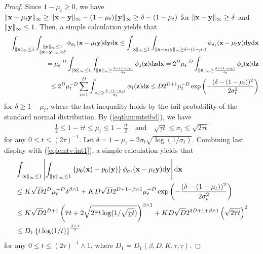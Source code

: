 \documentclass[twoside,11pt]{article}
\newcommand{\bx}{{\bf x}}
\newcommand{\by}{{\bf y}}
\newcommand{\bz}{{\bf z}}
\newcommand{\be}{\begin{equation}}
\newcommand{\ee}{\end{equation}}
\newcommand{\bean}{\setlength\arraycolsep{1pt}\begin{eqnarray*}}
\newcommand{\eean}{\end{eqnarray*}}
\def\d{{\rm d}}
\begin{document}
\begin{proof}
Since $1-\mu_t \geq 0 $, we have $\| \bx- \mu_{t} \by \|_{\infty} \geq \| \bx - \by\|_{\infty} -  ( 1 - \mu_t ) \|\by\|_{\infty} \geq \delta - ( 1 - \mu_t )$ for $\|\bx-\by\|_{\infty} \geq \delta$ and $\| \by\|_{\infty} \leq 1$.
Then, a simple calculation yields that
\bean
&& \int_{\| \bx \|_{\infty} \leq 1} \int_{\substack{ \| \by \|_{\infty} \leq 1 \\ \|\bx-\by\|_{\infty}\geq \delta  }}  \phi_{\sigma_{t}}(\bx-\mu_t \by) \d \by \d \bx \leq 
\int_{\| \bx \|_{\infty} \leq 1} \int_{ \|\bx-\mu_t\by\|_{\infty} \geq \delta - (1-\mu_t)  } \phi_{\sigma_t}(\bx-\mu_t \by) \d \by \d \bx
\\
&& = \mu_t^{-D} \int_{\| \bx \|_{\infty} \leq 1} \int_{\|\bz\|_{\infty} \geq \frac{\delta - (1-\mu_t)}{\sigma_t}} \phi_{1}(\bz) \d \bz \d \bx
= 2^{D} \mu_t^{-D} \int_{\|\bz\|_{\infty} \geq \frac{\delta - (1-\mu_t)}{\sigma_t}} \phi_{1}(\bz) \d \bz 
\\
&& \leq 2^{D} \mu_t^{-D} \sum_{i=1}^{D} \int_{\vert z_i \vert \geq \frac{\delta - (1-\mu_t)}{\sigma_t}} \phi_{1}(\bz) \d \bz
\leq D 2^{D+1} \mu_{t}^{-D} \exp \left( -\frac{ (\delta - (1-\mu_t))^2  }{2\sigma_t^2} \right)
\eean
for $\delta \geq 1-\mu_t$, where the last inequality holds by the tail probability of the standard normal distribution.
By (\ref{eqthm:mtstbd}), we have
\bean
 \frac{1}{2} \leq 1- \overline{\tau}t \leq \mu_t \leq 1- \frac{\underline{\tau}t}{2} \quad \text{and} \quad 
\sqrt{\underline{\tau}t } \leq \sigma_t \leq \sqrt{2\overline{\tau}t}
\eean
for any $0 \leq t \leq (2\overline{\tau})^{-1}$.
Let $\delta = 1-\mu_t +  2\sigma_{t} \sqrt{\log (1/\sigma_t)}$.
Combining last display with (\ref{eqlemtv:int1}), a simple calculation yields that
\be \begin{split}
 & \int_{\| \bx \|_{\infty} \leq 1} \left\vert   \int_{\| \by \|_{\infty} \leq 1} \left\{ p_0(\bx) - p_0(\by) \right\} \phi_{\sigma _t}(\bx - \mu_t \by) \d \by \right\vert \d \bx 
 \\
 & \leq K\sqrt{D} 2^{D} \mu_{t}^{-D} \delta^{\beta \wedge 1} + KD\sqrt{D} 2^{D + 1 + \beta \wedge 1} \mu_{t}^{-D} \exp \left( -\frac{ (\delta - (1-\mu_t))^2  }{2\sigma_t^2} \right)
 \\
 & \leq K\sqrt{D} 2^{D+1} \left( \overline{\tau} t + 2\sqrt{2 \overline{\tau} t \log (1/\sqrt{\underline{\tau} t}) } \right)^{\beta \wedge 1} + KD\sqrt{D} 2^{ 2D + 1 + \beta \wedge 1} \left( \sqrt{2\overline{\tau}t} \right)^{2}
 \\
 & \leq D_{1}  \left\{ t \log (1/t) \right\}^{\frac{\beta \wedge 1}{2}}
 \label{eqlemtv:intfin1}
 \end{split}
\ee
for any $0 \leq t \leq (2\overline{\tau})^{-1} \wedge 1$,
where $D_{1} = D_{1}(\beta,D,K,\overline{\tau},\underline{\tau})$.


\end{proof}
\end{document}

